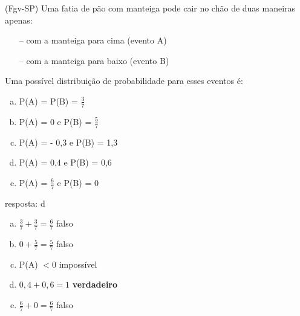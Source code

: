 \begin{ex}
 (Fgv-SP) Uma fatia de pão com manteiga pode cair no chão de duas maneiras apenas:
    \begin{itemize}
    \item[--] com a manteiga para cima (evento A)
    \item[--] com a manteiga para baixo (evento B)
    \end{itemize}
Uma possível distribuição de probabilidade para esses eventos é:
    \begin{enumerate}[(a)]
    \item P(A) = P(B) = $\frac{3}{7}$
    \item P(A) = 0 e P(B) = $\frac{5}{7}$
    \item P(A) = - 0,3 e P(B) = 1,3
    \item P(A) = 0,4 e P(B) = 0,6
    \item P(A) = $\frac{6}{7}$ e P(B) = 0
    \end{enumerate}
     \begin{sol}
      resposta: d 
       \begin{enumerate} [(a)]
           \item $\frac{3}{7}+\frac{3}{7}=\frac{6}{7}$ falso
           \item $0+\frac{5}{7}=\frac{5}{7}$ falso
           \item P(A) $<0$ impossível
           \item $0,4 +0,6 =1$ \textbf{verdadeiro}
           \item $\frac{6}{7}+0=\frac{6}{7}$ falso
       \end{enumerate}
     \end{sol}
\end{ex}
